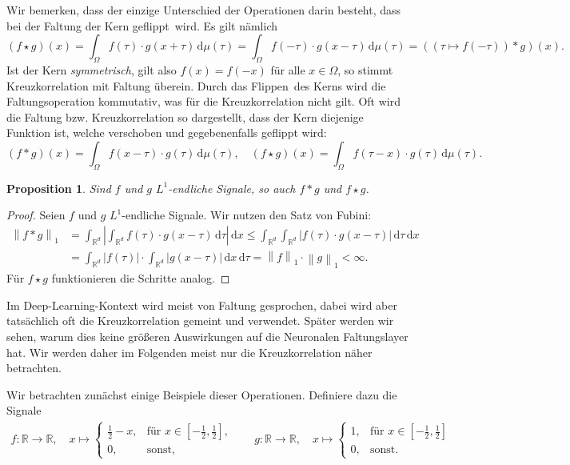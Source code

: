 \documentclass{article}
\newtheorem{proposition}[theorem]{Proposition}
\theoremstyle{definition}
\newcommand{\R}{\mathbb{R}}
\newcommand{\diff}{\,\textrm{d}}
\newcommand{\todo}[1]{{\color{red} #1}}
\newcommand{\norm}[1]{\left\lVert#1\right\rVert}
\newcommand{\abs}[1]{\left\lvert#1\right\rvert}
\begin{document}
Wir bemerken, dass der einzige Unterschied der Operationen darin besteht, dass bei der Faltung der Kern \glqq geflippt\grqq\ wird.
Es gilt nämlich \[
    \left(f \star g\right)(x) = \int_{\Omega} f(\tau) \cdot g(x+\tau) \diff\mu(\tau) = \int_\Omega f(-\tau) \cdot g(x - \tau) \diff\mu(\tau) = \left((\tau\mapsto f(-\tau)) * g\right)(x).
    \]
Ist der Kern \emph{symmetrisch}, gilt also $f(x) = f(-x)$ für alle $x\in\Omega$, so stimmt Kreuzkorrelation mit Faltung überein.
Durch das \glqq Flippen\grqq\ des Kerns wird die Faltungsoperation kommutativ, was für die Kreuzkorrelation nicht gilt.
Oft wird die Faltung bzw. Kreuzkorrelation so dargestellt, dass der Kern diejenige Funktion ist, welche verschoben und gegebenenfalls geflippt wird:
\[
    (f*g)(x) = \int_\Omega f(x - \tau) \cdot g(\tau)\diff\mu(\tau), \quad
    (f\star g)(x) = \int_\Omega f(\tau - x) \cdot g(\tau) \diff\mu(\tau).
\]

\begin{proposition}
    Sind $f$ und $g$ $L^1$-endliche Signale, so auch $f * g$ und $f\star g$.
\end{proposition}
\begin{proof}
    Seien $f$ und $g$ $L^1$-endliche Signale. Wir nutzen den Satz von Fubini:
    \begin{align*}
        \norm{f * g}_1
        &= \int_{\R^d} \abs{ \int_{\R^d} f(\tau)\cdot g(x - \tau) \diff\tau }\diff x
        \leq \int_{\R^d}  \int_{\R^d} \abs{f(\tau)\cdot g(x - \tau)} \diff\tau \diff x\\
        &= \int_{\R^d} \abs{f(\tau)} \cdot \int_{\R^d} \abs{g(x-\tau)} \diff x \diff\tau
        = \norm{f}_1 \cdot \norm{g}_1 < \infty.
    \end{align*}
    Für $f \star g$ funktionieren die Schritte analog.
\end{proof}

Im Deep-Learning-Kontext wird meist von Faltung gesprochen, dabei wird aber tatsächlich oft die Kreuzkorrelation gemeint und verwendet.
\todo{Später werden wir sehen, warum dies keine größeren Auswirkungen auf die Neuronalen Faltungslayer hat.}
Wir werden daher im Folgenden meist nur die Kreuzkorrelation näher betrachten.

Wir betrachten zunächst einige Beispiele dieser Operationen.
Definiere dazu die Signale
\begin{align*}
    f: \R \rightarrow \R, \quad x \mapsto \begin{cases}
        \frac{1}{2} - x, & \text{für $x\in[-\frac{1}{2},\frac{1}{2}]$,}\\
        0, & \text{sonst,}
    \end{cases} \qquad
    g: \R \rightarrow \R,\quad x \mapsto \begin{cases}
        1,& \text{für $x \in [-\frac{1}{2},\frac{1}{2}]$}\\
        0, & \text{sonst.}
    \end{cases}
\end{align*}
\end{document}
